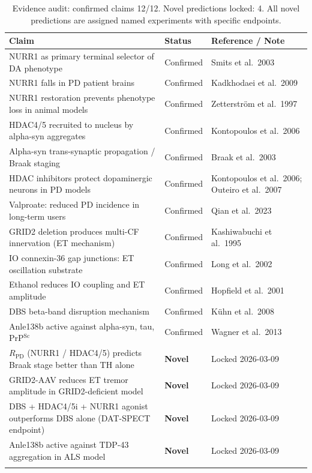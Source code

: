 \documentclass[12pt,a4paper]{article}
\begin{document}
\begin{longtable}{p{7cm} p{2.5cm} p{3cm}}
  \toprule
  \textbf{Claim} & \textbf{Status} & \textbf{Reference / Note} \\
  \midrule
  NURR1 as primary terminal selector of DA phenotype &
    Confirmed & Smits et al.\ 2003 \\
  NURR1 falls in PD patient brains &
    Confirmed & Kadkhodaei et al.\ 2009 \\
  NURR1 restoration prevents phenotype loss in animal models &
    Confirmed & Zetterström et al.\ 1997 \\
  HDAC4/5 recruited to nucleus by alpha-syn aggregates &
    Confirmed & Kontopoulos et al.\ 2006 \\
  Alpha-syn trans-synaptic propagation / Braak staging &
    Confirmed & Braak et al.\ 2003 \\
  HDAC inhibitors protect dopaminergic neurons in PD models &
    Confirmed & Kontopoulos et al.\ 2006; Outeiro et al.\ 2007 \\
  Valproate: reduced PD incidence in long-term users &
    Confirmed & Qian et al.\ 2023 \\
  GRID2 deletion produces multi-CF innervation (ET mechanism) &
    Confirmed & Kashiwabuchi et al.\ 1995 \\
  IO connexin-36 gap junctions: ET oscillation substrate &
    Confirmed & Long et al.\ 2002 \\
  Ethanol reduces IO coupling and ET amplitude &
    Confirmed & Hopfield et al.\ 2001 \\
  DBS beta-band disruption mechanism &
    Confirmed & Kühn et al.\ 2008 \\
  Anle138b active against alpha-syn, tau, PrP$^{\mathrm{Sc}}$ &
    Confirmed & Wagner et al.\ 2013 \\
  \midrule
  $R_{\mathrm{PD}}$ (NURR1 / HDAC4/5) predicts Braak stage better
    than TH alone & \textbf{Novel} & Locked 2026-03-09 \\
  GRID2-AAV reduces ET tremor amplitude in GRID2-deficient model &
    \textbf{Novel} & Locked 2026-03-09 \\
  DBS + HDAC4/5i + NURR1 agonist outperforms DBS alone (DAT-SPECT
    endpoint) & \textbf{Novel} & Locked 2026-03-09 \\
  Anle138b active against TDP-43 aggregation in ALS model &
    \textbf{Novel} & Locked 2026-03-09 \\
  \bottomrule
  \caption{Evidence audit: confirmed claims 12/12. Novel predictions
    locked: 4. All novel predictions are assigned named experiments
    with specific endpoints.}
\end{longtable}
\end{document}
